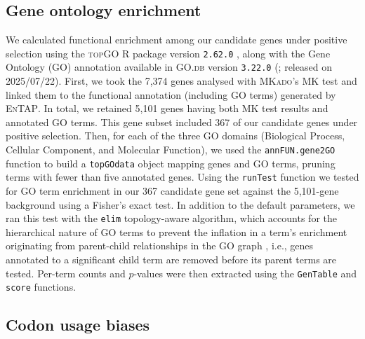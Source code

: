 \subsection*{Gene ontology enrichment}

We calculated functional enrichment among our candidate genes under positive selection
using the \textsc{topGO} R package version \texttt{2.62.0} \citep{alexa_topgo_2017},
along with the Gene Ontology (GO) annotation available in \textsc{GO.db} version
\texttt{3.22.0} (\citealp{carlson_godb_2017}; released on 2025/07/22).
First, we took the 7{,}374 genes analysed with \textsc{MKado}'s MK test and linked
them to the functional annotation (including GO terms) generated by \textsc{EnTAP}.
In total, we retained 5{,}101 genes having both MK test results and annotated GO terms.
This gene subset included 367 of our candidate genes under positive selection.
Then, for each of the three GO domains (Biological Process, Cellular Component, and
Molecular Function), we used the \texttt{annFUN.gene2GO} function to build a
\texttt{topGOdata} object mapping genes and GO terms, pruning terms with fewer than five
annotated genes.
Using the \texttt{runTest} function we tested for GO term enrichment in our 367 candidate
gene set against the 5{,}101-gene background using a Fisher's exact test.
In addition to the default parameters, we ran this test with the \texttt{elim} topology-aware
algorithm, which accounts for the hierarchical nature of GO terms to prevent the inflation
in a term's enrichment originating from parent-child relationships in the GO graph
\citep{alexa_topgo_2006}, i.e., genes annotated to a significant child term are removed
before its parent terms are tested.
Per-term counts and $p$-values were then extracted using the \texttt{GenTable} and
\texttt{score} functions.

\subsection*{Codon usage biases}

